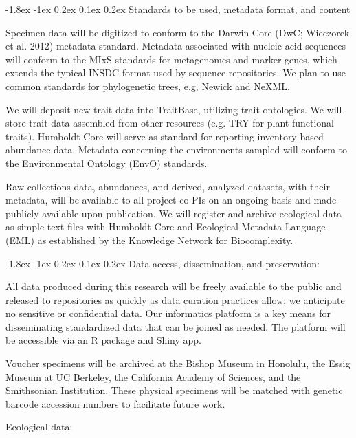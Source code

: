 \documentclass[11pt]{article}
\makeatletter
\renewcommand\section{\@startsection{section}{1}{\z@}%
                                  {-1.8ex \@plus -1ex \@minus 0.2ex}%
                                  {0.1ex \@plus 0.2ex}%
                                  {\normalfont\Large\bfseries}}
\renewcommand{\paragraph}{\@startsection{paragraph}{4}{\z@}
  {1ex \@plus 1ex \@minus .2ex}{-1em}
  {\normalfont\normalsize\bf}
}
\makeatother
\begin{document}
\section{Standards to be used, metadata format, and content}

Specimen data will be digitized to conform to the Darwin Core (DwC; Wieczorek et al. 2012) metadata standard.  Metadata associated with nucleic acid sequences will conform to the MIxS standards for metagenomes and marker genes, which extends the typical INSDC format used by sequence repositories.   We plan to use common standards for phylogenetic trees, e.g, Newick and NeXML.  

We will deposit new trait data into TraitBase, utilizing trait ontologies.  We will store trait data assembled from other resources (e.g. TRY for plant functional traits). Humboldt Core will serve as standard for reporting inventory-based abundance data.   Metadata concerning the environments sampled will conform to the Environmental Ontology (EnvO) standards.  

Raw collections data, abundances, and derived, analyzed datasets, with their metadata, will be available to all project co-PIs on an ongoing basis and made publicly available upon publication. We will register and archive ecological data as simple text files with Humboldt Core and Ecological Metadata Language (EML) as established by the Knowledge Network for Biocomplexity.

\section{Data access, dissemination, and preservation:} 

All data produced during this research will be freely available to the public and released to repositories as quickly as data curation practices allow; we anticipate no sensitive or confidential data.   Our informatics platform is a key means for disseminating standardized data that can be joined as needed.  The platform will be accessible via an R package and Shiny app.

Voucher specimens will be archived at the Bishop Museum in Honolulu, the Essig Museum at UC Berkeley, the California Academy of Sciences, and the Smithsonian Institution. These physical specimens will be matched with genetic barcode accession numbers to facilitate future work.

\paragraph{Ecological data:} 
\end{document}
